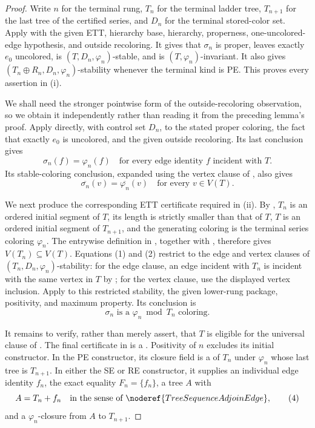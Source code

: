 \begin{proof}
Write $n$ for the terminal rung, $T_n$ for the terminal ladder tree,
$T_{n+1}$ for the last tree of the certified series, and
$D_n$ for the terminal stored-color set.  Apply
 with the given ETT, hierarchy base,
hierarchy, properness, one-uncolored-edge hypothesis, and outside
recoloring.  It gives that $\sigma_n$ is proper, leaves exactly $e_0$
uncolored, is $(T,D_n,\varphi_n)$-stable, and is
$(T,\varphi_n)$-invariant.  It also gives
$(T_n\oplus R_n,D_n,\varphi_n)$-stability whenever the terminal kind is
PE.  This proves every assertion in (i).

We shall need the stronger pointwise form of the outside-recoloring
observation, so we obtain it independently rather than reading it from
the preceding lemma's proof.  Apply
 directly, with control set $D_n$,
to the stated proper coloring, the fact that exactly $e_0$ is uncolored,
and the given outside recoloring.  Its last conclusion gives
\[
 \sigma_n(f)=\varphi_n(f)
 \quad\text{for every edge identity $f$ incident with $T$.}   \tag{1}
\]
Its stable-coloring conclusion, expanded using the vertex clause of
, also gives
\[
 \overline{\sigma_n}(v)=\overline{\varphi_n}(v)
 \quad\text{for every $v\in V(T)$.}                           \tag{2}
\]

We next produce the corresponding ETT certificate required in (ii).
By , $T_n$ is an ordered initial segment
of $T$, its length is strictly smaller than that of $T$, $T$ is an
ordered initial segment of $T_{n+1}$, and the generating coloring is the
terminal series coloring $\varphi_n$.  The entrywise definition in
, together with
, therefore gives
$V(T_n)\subseteq V(T)$.  Equations (1) and (2) restrict to the edge and
vertex clauses of $(T_n,D_n,\varphi_n)$-stability: for the edge clause,
an edge incident with $T_n$ is incident with the same vertex in $T$ by
; for the vertex clause, use the displayed
vertex inclusion.  Apply  to this restricted stability,
the given lower-rung package, positivity, and maximum property.  Its
conclusion is
\[
                 \sigma_n\text{ is a }\varphi_n\bmod T_n
                 \text{ coloring}.                           \tag{3}
\]

It remains to verify, rather than merely assert, that $T$ is eligible
for the universal clause of .  The final certificate
in  is a
.  Positivity of $n$ excludes its initial
constructor.  In the PE constructor, its closure field is a
 of $T_n$ under $\varphi_n$ whose last tree is
$T_{n+1}$.  In either the SE or RE constructor, it supplies an individual
edge identity $f_n$, the exact equality $F_n=\{f_n\}$, a tree $A$ with
\[
              A=T_n+f_n
              \quad\text{in the sense of }
              \noderef{TreeSequenceAdjoinEdge},               \tag{4}
\]
and a $\varphi_n$-closure from $A$ to $T_{n+1}$.


\end{proof}
